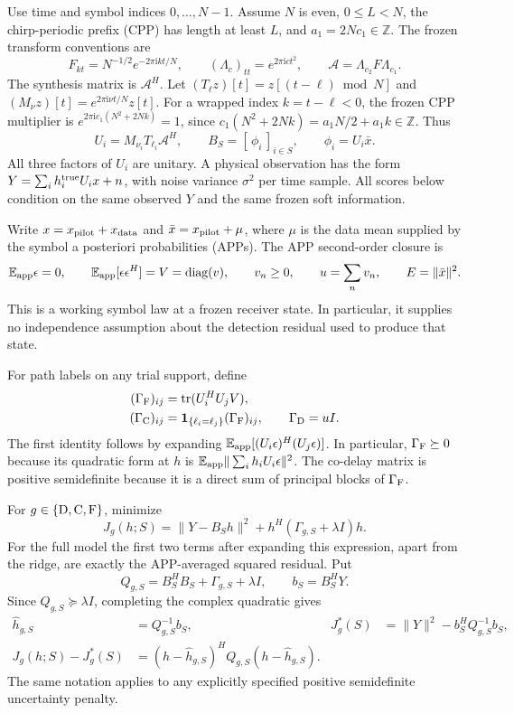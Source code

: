 Use time and symbol indices $0,\ldots,N-1$. Assume $N$ is even,
$0\le L<N$, the chirp-periodic prefix (CPP) has length at least $L$,
and $a_1=2Nc_1\in\mathbb Z$. The frozen transform conventions are
\[
 F_{kt}=N^{-1/2}e^{-2\pi\mathrm{i}kt/N},\qquad
 (\Lambda_c)_{tt}=e^{2\pi\mathrm{i}ct^2},\qquad
 \mathcal A=\Lambda_{c_2}F\Lambda_{c_1}.
\]
The synthesis matrix is $\mathcal A^H$. Let
$(T_\ell z)[t]=z[(t-\ell)\bmod N]$ and
$(M_\nu z)[t]=e^{2\pi\mathrm{i}\nu t/N}z[t]$.
For a wrapped index $k=t-\ell<0$, the frozen CPP multiplier is
$e^{2\pi\mathrm{i}c_1(N^2+2Nk)}=1$, since
$c_1(N^2+2Nk)=a_1N/2+a_1k\in\mathbb Z$. Thus
\[
 U_i=M_{\nu_i}T_{\ell_i}\mathcal A^H,\qquad
 B_S=[\,\phi_i\,]_{i\in S},\qquad \phi_i=U_i\bar x .
\]
All three factors of $U_i$ are unitary. A physical observation has the form
$Y=\sum_i h_i^{\rm true}U_ix+n$, with noise variance $\sigma^2$ per
time sample. All scores below condition on the same observed $Y$ and the
same frozen soft information.

Write $x=x_{\rm pilot}+x_{\rm data}$ and
$\bar x=x_{\rm pilot}+\mu$, where $\mu$ is the data mean supplied by the
symbol a posteriori probabilities (APPs). The APP second-order closure is
\[
 \mathbb E_{\rm app}\epsilon=0,\qquad
 \mathbb E_{\rm app}[\epsilon\epsilon^H]=V=\operatorname{diag}(v),
 \qquad v_n\ge0,\qquad u=\sum_n v_n,\qquad E=\|\bar x\|^2.
\]
This is a working symbol law at a frozen receiver state. In particular,
it supplies no independence assumption about the detection residual used
to produce that state.

For path labels on any trial support, define
\[
 \begin{split}
 (\Gamma_{\rm F})_{ij}
   &=\operatorname{tr}(U_i^HU_jV),\\
 (\Gamma_{\rm C})_{ij}
   &=\mathbf 1_{\{\ell_i=\ell_j\}}(\Gamma_{\rm F})_{ij},\qquad
 \Gamma_{\rm D}=uI .
 \end{split}
\]
The first identity follows by expanding
$\mathbb E_{\rm app}[(U_i\epsilon)^H(U_j\epsilon)]$. In particular,
$\Gamma_{\rm F}\succeq0$ because its quadratic form at $h$ is
$\mathbb E_{\rm app}\|\sum_i h_iU_i\epsilon\|^2$.
The co-delay matrix is positive semidefinite because it is a direct sum
of principal blocks of $\Gamma_{\rm F}$.

For $g\in\{{\rm D},{\rm C},{\rm F}\}$, minimize
\[
 J_g(h;S)=\|Y-B_Sh\|^2+h^H(\Gamma_{g,S}+\lambda I)h .
\]
For the full model the first two terms after expanding this expression,
apart from the ridge, are exactly the APP-averaged squared residual.
Put
\[
 Q_{g,S}=B_S^HB_S+\Gamma_{g,S}+\lambda I,\qquad b_S=B_S^HY .
\]
Since $Q_{g,S}\succeq\lambda I$, completing the complex quadratic gives
\begin{align}
 \hat h_{g,S}&=Q_{g,S}^{-1}b_S, &
 J_g^*(S)&=\|Y\|^2-b_S^HQ_{g,S}^{-1}b_S, \label{eq:af-profile}\\
 J_g(h;S)-J_g^*(S)
   &=(h-\hat h_{g,S})^HQ_{g,S}(h-\hat h_{g,S}). \label{eq:af-square}
\end{align}
The same notation applies to any explicitly specified positive semidefinite
uncertainty penalty.

